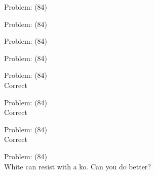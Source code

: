 \documentclass[11pt]{article}
\begin{document}
\begin{minipage}[t]{0.5\textwidth}
  {\centering
  
  Problem: (84)\\
  
  }
\end{minipage}
\begin{minipage}[t]{0.5\textwidth}
  {\centering
  
  Problem: (84)\\
  
  }
\end{minipage}
\begin{minipage}[t]{0.5\textwidth}
  {\centering
  
  Problem: (84)\\
  
  }
\end{minipage}
\begin{minipage}[t]{0.5\textwidth}
  {\centering
  
  Problem: (84)\\
  
  }
\end{minipage}
\begin{minipage}[t]{0.5\textwidth}
  {\centering
  
  Problem: (84)\\
  Correct\\
  }
\end{minipage}
\begin{minipage}[t]{0.5\textwidth}
  {\centering
  
  Problem: (84)\\
  Correct\\
  }
\end{minipage}
\begin{minipage}[t]{0.5\textwidth}
  {\centering
  
  Problem: (84)\\
  Correct\\
  }
\end{minipage}
\begin{minipage}[t]{0.5\textwidth}
  {\centering
  
  Problem: (84)\\
  White can resist with a ko. Can you do better?\\
  }
\end{minipage}
\end{document}
